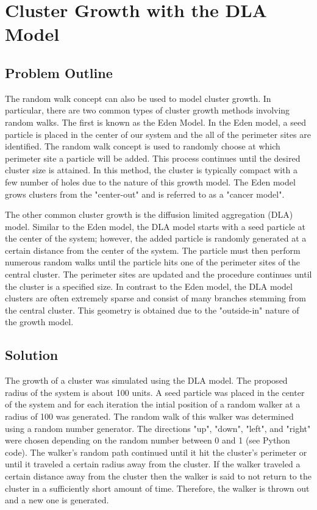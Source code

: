 \documentclass[a4paper,12pt]{article}
\begin{document}
\section{Cluster Growth with the DLA Model}
\subsection{Problem Outline}
\indent
\indent The random walk concept can also be used to model cluster growth.  In particular, there are two common types of cluster growth methods involving random walks.
The first is known as the Eden Model.  In the Eden model, a seed particle is placed in the center of our system and the all of the perimeter sites are identified.  The 
random walk concept is used to randomly choose at which perimeter site a particle will be added.  This process continues until the desired cluster size is attained.
In this method, the cluster is typically compact with a few number of holes due to the nature of this growth model.  The Eden model grows clusters from the "center-out" 
and is referred to as a "cancer model". 

\indent The other common cluster growth is the diffusion limited aggregation (DLA) model.  Similar to the Eden model, the DLA model starts with a seed particle at 
the center of the system; however, the added particle is randomly generated at a certain distance from the center of the system.  The particle must then perform 
numerous random walks until the particle hits one of the perimeter sites of the central cluster.  The perimeter sites are updated and the procedure continues until
the cluster is a specified size.  In contrast to the Eden model, the DLA model clusters are often extremely sparse and consist of many branches stemming from the 
central cluster.  This geometry is obtained due to the "outside-in" nature of the growth model.

\subsection{Solution}
\indent
\indent The growth of a cluster was simulated using the DLA model.  The proposed radius of the system is about 100 units.  A seed particle was placed in the center of 
the system and for each iteration the intial position of a random walker at a radius of 100 was generated.  The random walk of this walker was determined using a 
random number generator.  The directions "up", "down", "left", and "right" were chosen depending on the random number between 0 and 1 (see Python code). The walker's random path
continued until it hit the cluster's perimeter or until it traveled a certain radius away from the cluster.  If the walker traveled a certain distance away from the 
cluster then the walker is said to not return to the cluster in a sufficiently short amount of time. Therefore, the walker is thrown out and a new one is generated.
\end{document}
